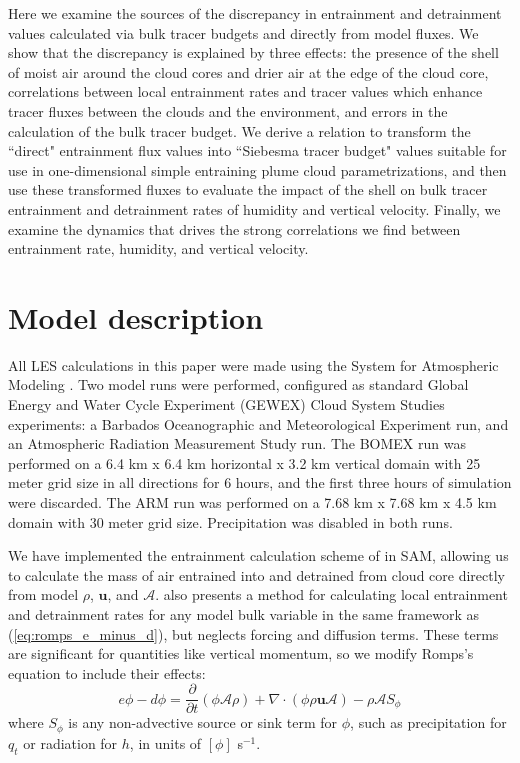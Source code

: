 \documentclass[12pt]{article}
\begin{document}
Here we examine the sources of the discrepancy in entrainment and
detrainment values calculated via bulk tracer budgets and directly
from model fluxes.  We show that the discrepancy is explained by three
effects: the presence of the shell of moist air around the cloud cores
and drier air at the edge of the cloud core, correlations between
local entrainment rates and tracer values which enhance tracer fluxes
between the clouds and the environment, and errors in the calculation
of the bulk tracer budget.  We derive a relation to transform the
``direct" entrainment flux values into ``Siebesma tracer budget"
values suitable for use in one-dimensional simple entraining plume
cloud parametrizations, and then use these transformed fluxes to
evaluate the impact of the shell on bulk tracer entrainment and
detrainment rates of humidity and vertical velocity.  Finally, we
examine the dynamics that drives the strong correlations we find
between entrainment rate, humidity, and vertical velocity.


\section{Model description}

All LES calculations in this paper were made using the System for Atmospheric 
Modeling \citep[SAM;][]{Khairoutdinov2003}.  Two model runs were performed, 
configured as standard Global Energy and Water Cycle Experiment (GEWEX) 
Cloud System Studies \citep[GCSS;][]{Randall2003} experiments: a Barbados 
Oceanographic and Meteorological Experiment \citep[BOMEX;][]{Siebesma2003} run,
and an Atmospheric Radiation Measurement Study \citep[ARM;][]{Brown2002} run. 
The BOMEX run was performed on a 6.4 km x 6.4 km horizontal x 3.2 km vertical 
domain with 25 meter grid size in all directions for 6 hours, and the first 
three hours of simulation were discarded. The ARM run was performed on a 
7.68 km x 7.68 km x 4.5 km domain with 30 meter grid size.  Precipitation was 
disabled in both runs.

We have implemented the entrainment calculation scheme of \cite{Romps2010} in 
SAM, allowing us to calculate the mass of air entrained into and detrained from
cloud core directly from model $\rho$, $\mathbf{u}$, and $\mathcal{A}$.  
\citet[eq. 4]{Romps2010} also presents a method for calculating local 
entrainment and detrainment rates for any model bulk variable in the same
framework as (\ref{eq:romps_e_minus_d}), but neglects forcing and diffusion
terms.  These terms are significant for quantities like vertical momentum, so 
we modify Romps's equation to include their effects:
\begin{equation}
  \label{eq:romps_ephi_minus_dphi}
  e\phi - d\phi = \frac{\partial}{\partial t}(\phi \mathcal{A} \rho) 
                + \nabla \cdot (\phi \rho \mathbf{u} \mathcal{A})
                - \rho \mathcal{A}S_\phi
\end{equation}
where $S_\phi$ is any non-advective source or sink term for $\phi$, such as 
precipitation for $q_t$ or radiation for $h$, in units of $[\phi]$ s$^{-1}$.  
\end{document}
